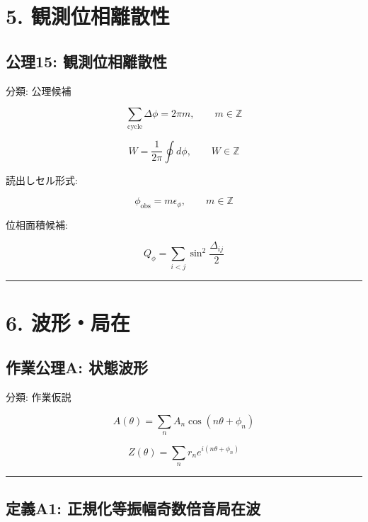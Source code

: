 \documentclass[
  a4paper,
]{ltjsarticle}
\begin{document}
\section{5.
観測位相離散性}\label{ux89b3ux6e2cux4f4dux76f8ux96e2ux6563ux6027}

\subsection{公理15:
観測位相離散性}\label{ux516cux740615-ux89b3ux6e2cux4f4dux76f8ux96e2ux6563ux6027}

分類: 公理候補

\[
\sum_{\mathrm{cycle}}\Delta\phi=2\pi m,\qquad m\in\mathbb{Z}
\]

\[
W=\frac{1}{2\pi}\oint d\phi,\qquad W\in\mathbb{Z}
\]

読出しセル形式:

\[
\phi_{\mathrm{obs}}=m\epsilon_\phi,\qquad m\in\mathbb{Z}
\]

位相面積候補:

\[
Q_\phi=\sum_{i<j}\sin^2\frac{\Delta_{ij}}{2}
\]

\begin{center}\rule{0.5\linewidth}{0.5pt}\end{center}

\section{6. 波形・局在}\label{ux6ce2ux5f62ux5c40ux5728}

\subsection{作業公理A:
状態波形}\label{ux4f5cux696dux516cux7406a-ux72b6ux614bux6ce2ux5f62}

分類: 作業仮説

\[
A(\theta)=\sum_n A_n\cos(n\theta+\phi_n)
\]

\[
Z(\theta)=\sum_n r_n e^{i(n\theta+\phi_n)}
\]

\begin{center}\rule{0.5\linewidth}{0.5pt}\end{center}

\subsection{定義A1:
正規化等振幅奇数倍音局在波}\label{ux5b9aux7fa9a1-ux6b63ux898fux5316ux7b49ux632fux5e45ux5947ux6570ux500dux97f3ux5c40ux5728ux6ce2}
\end{document}
